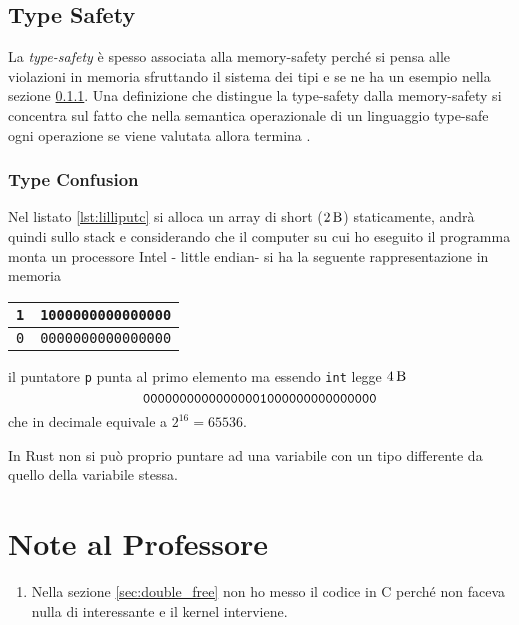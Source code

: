 \documentclass{article}
\begin{document}
\subsection{Type Safety}
La \textit{type-safety} è spesso associata alla memory-safety perché si pensa alle violazioni in memoria sfruttando il sistema dei tipi e se ne ha un esempio nella sezione \ref{sec:type_confusion}. Una definizione che distingue la type-safety dalla memory-safety si concentra sul fatto che nella semantica operazionale di un linguaggio type-safe ogni operazione se viene valutata allora termina \cite{typesafety}. 

\subsubsection{Type Confusion} \label{sec:type_confusion}
Nel listato \ref{lst:lilliputc} si alloca un array di short ($\SI{2}{\byte} $) staticamente, andrà quindi sullo stack e considerando che il computer su cui ho eseguito il programma monta un processore Intel - little endian- si ha la seguente rappresentazione in memoria

\begin{table}[H]
	\label{fig:mem_type_stack}
	\centering
	\begin{tabular}{|c|c|}
		\hline
		\texttt{1} & \texttt{1000000000000000} \\
		\hline 
		\texttt{0} & \texttt{0000000000000000} \\
		\hline
	\end{tabular}
\end{table}

il puntatore \texttt{p} punta al primo elemento ma essendo \texttt{int} legge $\SI{4}{\byte}$  
\[
\texttt{00000000000000001000000000000000} \\
\]
che in decimale equivale a $ 2^{16} = 65536 $.




In Rust non si può proprio puntare ad una variabile con un tipo differente da quello della variabile stessa.




\section{Note al Professore}
\begin{enumerate}
	\item Nella sezione \ref{sec:double_free} non ho messo il codice in C perché non faceva nulla di interessante e il kernel interviene.
\end{enumerate}

\clearpage
%

{}
\end{document}
